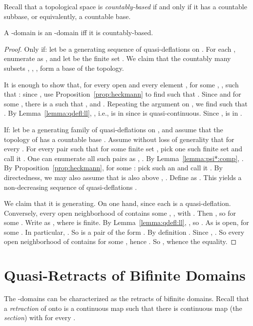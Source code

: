 \documentclass{LMCS}
\begin{document}
Recall that a topological space is \emph{countably-based} if and only
if it has a countable subbase, or equivalently, a countable base.
\begin{prop}
  \label{prop:omega:qrb:2}
  A -domain  is an -domain iff it is
  countably-based.
\end{prop}
\begin{proof}
  Only if: let  be a generating sequence
  of quasi-deflations on .  For each , enumerate  as , and let  be the finite set .
  We claim that the countably many subsets , , , form a base of the topology.

  It is enough to show that, for every open  and every element ,  for some , , such that : since , use
  Proposition~\ref{prop:heckmann} to find  such that
  .  Since  and
   for some , there is a  such that , and .  Repeating the
  argument on , we find  such that .  By Lemma~\ref{lemma:qdefl:ll}, , i.e.,  is in  since  is
  quasi-continuous.  Since ,  is in .

  If: let  be a generating family of
  quasi-deflations on , and assume that the topology of  has a
  countable base .  Assume without loss of
  generality that  for every .  For
  every pair  such that  for some finite set , pick one such finite set and
  call it .  One can enumerate all such pairs as , .  By Lemma~\ref{lemma:psi*:comp}, .  By Proposition~\ref{prop:heckmann},
   for some
  : pick such an  and call it .  By directedness, we
  may also assume that  is also above ,
  .  Define  as .  This yields a
  non-decreasing sequence of quasi-deflations .

  We claim that it is generating.  On one hand,  since each  is a
  quasi-deflation.  Conversely, every open neighborhood  of 
  contains some , , with .  Then , so
   for some .  Write  as , where  is finite.  By
  Lemma~\ref{lemma:qdefl:ll}, , so .  As  is
  open,  for some .
  In particular, .  So  is a pair of the form .  By definition
  .  Since , .  So every open neighborhood  of  contains
   for some , hence .  So , whence the equality.
\end{proof}

\section{Quasi-Retracts of Bifinite Domains}
\label{sec:qretr}

The -domains can be characterized as the retracts of bifinite
domains.  Recall that a {\em retraction\/} of  onto  is a
continuous map  such that there is continuous map  (the {\em section\/}) with  for every .
\end{document}
